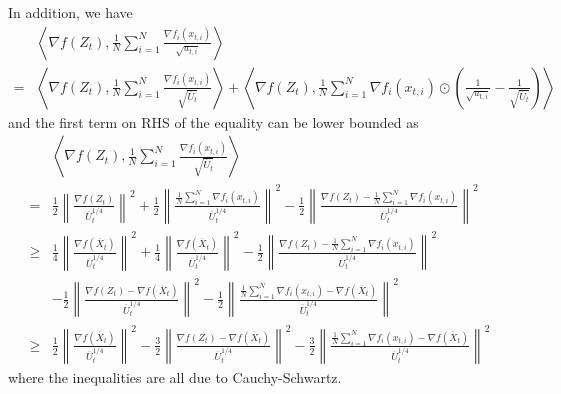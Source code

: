 \documentclass{article} %
\begin{document}
In addition, we have 
\begin{align}\label{eq: u_to_u_bar}
&\left \langle \nabla f( Z_{t}), \frac{1}{N} \sum_{i=1}^N \frac{\nabla f_i(x_{t,i})}{\sqrt{u_{t,i}}}  \right \rangle  \nonumber \\
= &  \left \langle \nabla f( Z_{t}), \frac{1}{N} \sum_{i=1}^N \frac{\nabla f_i( x_{t,i})}{\sqrt{\overline U_{t}}}  \right \rangle  +\left \langle \nabla f( Z_{t}), \frac{1}{N} \sum_{i=1}^N \nabla f_i( x_{t,i})\odot \left(\frac{1}{\sqrt{u_{t,i}}} - \frac{1}{\sqrt{\overline U_{t}}}  \right)  \right \rangle 
\end{align}
and the first term on RHS of the equality can be lower bounded as 
\begin{align} \label{eq: split_1}
&\left \langle \nabla f( Z_{t}), \frac{1}{N} \sum_{i=1}^N \frac{\nabla f_i( x_{t,i})}{\sqrt{\overline U_{t}}}  \right \rangle \nonumber \\
= &\frac{1}{2} \left\|\frac{\nabla f( Z_{t})}{\overline U_{t}^{1/4}}\right\|^2 + \frac{1}{2}\left\|  \frac{\frac{1}{N}\sum_{i=1}^N \nabla f_i( x_{t,i}) }{\overline U_{t}^{1/4}}  \right\|^2 - \frac{1}{2 }\left\| \frac{\nabla f( Z_{t}) -\frac{1}{N}\sum_{i=1}^N \nabla f_i( x_{t,i})}{\overline U_{t}^{1/4}} \right\|^2 \nonumber \\
\geq & \frac{1}{4} \left\|\frac{\nabla f( \overline X_{t})}{\overline U_{t}^{1/4}}\right\|^2 + \frac{1}{4}\left\|  \frac{ \nabla f( \overline X_{t})}{\overline U_{t}^{1/4}}  \right\|^2 - \frac{1}{2 }\left\| \frac{\nabla f( Z_{t}) -\frac{1}{N}\sum_{i=1}^N \nabla f_i( x_{t,i})}{\overline U_{t}^{1/4}} \right\|^2  \nonumber \\
&- \frac{1}{2} \left\|\frac{\nabla f( Z_{t}) -\nabla f( \overline X_{t})}{\overline U_{t}^{1/4}}\right\|^2 - \frac{1}{2} \left\|  \frac{ \frac{1}{N}\sum_{i=1}^N \nabla f_i( x_{t,i}) -  \nabla f( \overline X_{t})}{\overline U_{t}^{1/4}}  \right\|^2 \nonumber \\
\geq & \frac{1}{2} \left\|\frac{\nabla f( \overline X_{t})}{\overline U_{t}^{1/4}}\right\|^2   - \frac{3}{2} \left\|\frac{\nabla f( Z_{t}) -\nabla f( \overline X_{t})}{\overline U_{t}^{1/4}}\right\|^2 - \frac{3}{2} \left\|  \frac{ \frac{1}{N}\sum_{i=1}^N \nabla f_i( x_{t,i}) -  \nabla f( \overline X_{t})}{\overline U_{t}^{1/4}}  \right\|^2
\end{align}
where the inequalities are all due to Cauchy-Schwartz.
\end{document}
